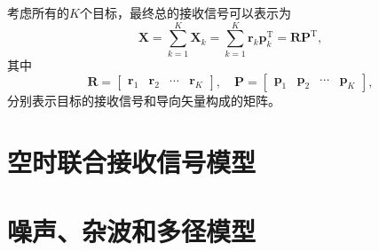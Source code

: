 考虑所有的\( K \)个目标，最终总的接收信号可以表示为
\[
    \mathbf{X} = \sum_{k=1}^{K} \mathbf{X}_k = \sum_{k=1}^{K} \bm{r}_k \bm{p}_k^{\mathrm{T}} = \mathbf{R} \mathbf{P}^{\mathrm{T}},
\]
其中
\[
    \mathbf{R} = \begin{bmatrix}
        \bm{r}_1 & \bm{r}_2 & \cdots & \bm{r}_K
    \end{bmatrix}, \quad \mathbf{P} = \begin{bmatrix}
        \bm{p}_1 & \bm{p}_2 & \cdots & \bm{p}_K
    \end{bmatrix},
\]
分别表示目标的接收信号和导向矢量构成的矩阵。

\section{空时联合接收信号模型}


\section{噪声、杂波和多径模型}

